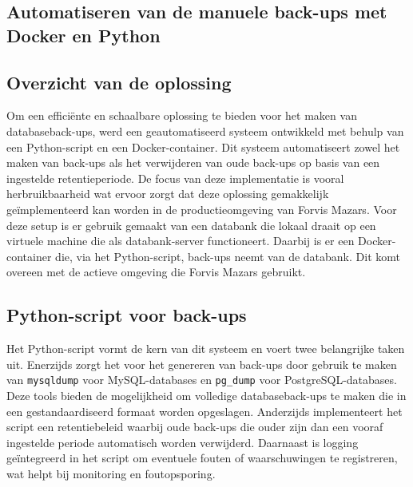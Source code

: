\subsection{Automatiseren van de manuele back-ups met Docker en Python}
\subsection{Overzicht van de oplossing}
Om een efficiënte en schaalbare oplossing te bieden voor het maken van databaseback-ups, werd een geautomatiseerd systeem ontwikkeld met behulp van een Python-script en een Docker-container. Dit systeem automatiseert zowel het maken van back-ups als het verwijderen van oude back-ups op basis van een ingestelde retentieperiode. De focus van deze implementatie is vooral herbruikbaarheid wat ervoor zorgt dat deze oplossing gemakkelijk geïmplementeerd kan worden in de productieomgeving van Forvis Mazars. Voor deze setup is er gebruik gemaakt van een databank die lokaal draait op een virtuele machine die als databank-server functioneert. Daarbij is er een Docker-container die, via het Python-script, back-ups neemt van de databank. Dit komt overeen met de actieve omgeving die Forvis Mazars gebruikt.

\subsection{Python-script voor back-ups}
Het Python-script vormt de kern van dit systeem en voert twee belangrijke taken uit. Enerzijds zorgt het voor het genereren van back-ups door gebruik te maken van \texttt{mysqldump} voor MySQL-databases en \texttt{pg\_dump} voor PostgreSQL-databases. Deze tools bieden de mogelijkheid om volledige databaseback-ups te maken die in een gestandaardiseerd formaat worden opgeslagen. Anderzijds implementeert het script een retentiebeleid waarbij oude back-ups die ouder zijn dan een vooraf ingestelde periode automatisch worden verwijderd. Daarnaast is logging geïntegreerd in het script om eventuele fouten of waarschuwingen te registreren, wat helpt bij monitoring en foutopsporing.

